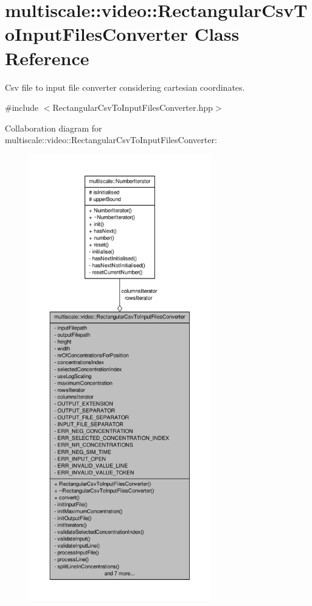 \hypertarget{classmultiscale_1_1video_1_1RectangularCsvToInputFilesConverter}{\section{multiscale\-:\-:video\-:\-:\-Rectangular\-Csv\-To\-Input\-Files\-Converter \-Class \-Reference}
\label{classmultiscale_1_1video_1_1RectangularCsvToInputFilesConverter}
}


\-Csv file to input file converter considering cartesian coordinates.  




{\ttfamily \#include $<$\-Rectangular\-Csv\-To\-Input\-Files\-Converter.\-hpp$>$}



\-Collaboration diagram for multiscale\-:\-:video\-:\-:\-Rectangular\-Csv\-To\-Input\-Files\-Converter\-:\nopagebreak
\begin{figure}[H]
\begin{center}
\leavevmode
\includegraphics[height=550pt]{classmultiscale_1_1video_1_1RectangularCsvToInputFilesConverter__coll__graph}
\end{center}
\end{figure}

